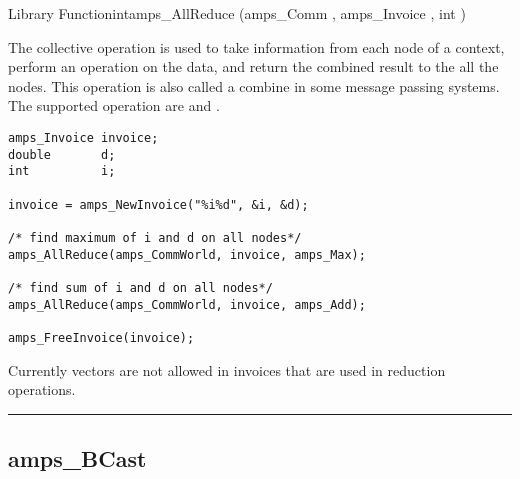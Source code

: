 \begin{deftypefn}{Library Function}{int}{amps\_AllReduce}
(amps_Comm , amps_Invoice , int ) 

\DESCRIPTION

The collective operation  is used to take information
from each node of a context, perform an operation on the data, and return
the combined result to the all the nodes.  This operation is also called
a combine in some message passing systems.  The supported operation are
 and .

\EXAMPLE

\begin{display}\begin{verbatim}
amps_Invoice invoice;
double       d;
int          i;

invoice = amps_NewInvoice("%i%d", &i, &d);

/* find maximum of i and d on all nodes*/
amps_AllReduce(amps_CommWorld, invoice, amps_Max);

/* find sum of i and d on all nodes*/
amps_AllReduce(amps_CommWorld, invoice, amps_Add);

amps_FreeInvoice(invoice);

\end{verbatim}\end{display}

\NOTES

Currently vectors are not allowed in invoices that are used in reduction
operations.

\end{deftypefn}


\noindent\rule{\textwidth}{1mm}

\subsection{amps\_BCast}
\label{amps_BCast}


